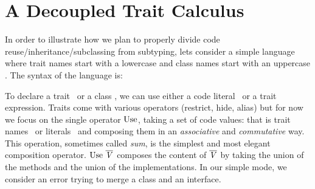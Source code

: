 \section{A Decoupled Trait Calculus}
In order to illustrate how we plan to properly divide code reuse/inheritance/subclassing from subtyping,
lets consider a simple language where trait names start with a lowercase \mt
and class names start with an uppercase \mC.  
The syntax of the language is:



\begin{comment}
\begin{bnf}
\prodFull\mTD{\mt\terminalCode{:}\mL \mid \mt\terminalCode{:} \use\ \overline\mV}{Trait Decl}\\
\prodFull\mCD{\mC\terminalCode{:}\mL \mid \mC\terminalCode{:} \use\ \overline\mV}{Class Decl}\\
\prodFull\mV{\mt \mid \mL}{Code Value}\\
\prodFull\mL{\Opt{\terminalCode{interface}}\ \terminalCode{implements} \overline\mT\ \overline\mMD}{Code Literal}\\
\prodFull\mT{\mC}{types are class names}\\
\prodFull\mMD{\Opt{\terminalCode{class}}\ \terminalCode{method}\ \mT\ \mm\oR\overline{\mT\,\mx}\cR \Opt\me}{Method Decl}\\

\prodFull\me{\mx\mid\mT\mid\me\terminalCode{.}\mm\oR\overline\me\cR}{expressions}\\
\prodFull\mD{\mCD\mid\mTD}{Declaration}\\
\end{bnf}
\end{comment}

To declare a trait \mTD\ or a class \mCD, we can use either a code literal \mL\ or a trait
expression.  Traits come with various operators (restrict, hide,
alias) but for now we focus on the single operator 
$\use$, taking a set
of code values: that is trait names \mt\ or literals \mL\ and composing them in an \emph{associative}
and \emph{commutative} way.  This operation, sometimes called \emph{sum}, is the simplest and most elegant
composition operator.  $\use\ \overline\mV$ composes the content of $\overline{\mathit{V}}$
by taking the union of the methods and the union of the implementations.
In our simple mode, we consider an error trying to merge a class and an interface.

